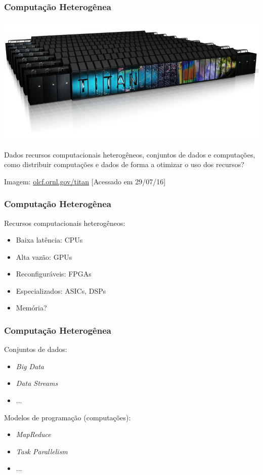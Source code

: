 \documentclass[10pt, compress]{beamer}
\begin{document}
\begin{frame}
    \frametitle{Computação Heterogênea}
    \begin{center}
        \includegraphics[width=.7\textwidth]{titan}
    \end{center}

    Dados recursos computacionais \alert{heterogêneos}, conjuntos de
    \alert{dados} e \alert{computações}, como distribuir computações e dados de
    forma a \alert{otimizar o uso} dos recursos?
    \hfill

    \begin{center}
    \tiny{Imagem: \url{olcf.ornl.gov/titan} [Acessado em 29/07/16]}
    \end{center}
\end{frame}

\begin{frame}
    \frametitle{Computação Heterogênea}
    Recursos computacionais \alert{heterogêneos}:
    \begin{itemize}
        \item Baixa latência: CPUs
        \item Alta vazão: GPUs
        \item Reconfiguráveis: FPGAs
        \item Especializados: ASICs, DSPs
            \pause
        \item Memória?
    \end{itemize}
\end{frame}

\begin{frame}
    \frametitle{Computação Heterogênea}
    Conjuntos de \alert{dados}:
    \begin{itemize}
        \item \textit{Big Data}
        \item \textit{Data Streams}
        \item ...
    \end{itemize}
    \pause
    Modelos de programação (\alert{computações}):
    \begin{itemize}
        \item \textit{MapReduce}
        \item \textit{Task Parallelism}
        \item ...
    \end{itemize}
\end{frame}
\end{document}
